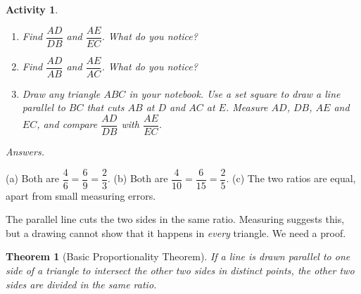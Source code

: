 \documentclass[11pt,a4paper]{article}
\theoremstyle{brand}
\newtheorem{theorem}{Theorem}
\theoremstyle{branddef}
\newtheorem*{activity}{Activity}
\newenvironment{answerblock}
  {\par\smallskip\Needspace{10\baselineskip}\begingroup\small\linespread{1.15}\selectfont\color{muted}\noindent\textit{Answers.}\par}
  {\par\endgroup\medskip}
\newcommand{\ramark}[3]{\coordinate (ra1) at ($(#1)!2mm!(#2)$);\coordinate (ra2) at ($(#1)!2mm!(#3)$);\draw[thin] (ra1) -- ($(ra1)+(ra2)-(#1)$) -- (ra2);}
\begin{document}
\begin{activity}
\begin{enumerate}[leftmargin=1.8em,itemsep=2pt,label=(\alph*)]
  \item Find $\dfrac{AD}{DB}$ and $\dfrac{AE}{EC}$. What do you notice?
  \item Find $\dfrac{AD}{AB}$ and $\dfrac{AE}{AC}$. What do you notice?
  \item Draw any triangle $ABC$ in your notebook. Use a set square to draw a line parallel to $BC$ that cuts $AB$ at $D$ and $AC$ at $E$. Measure $AD$, $DB$, $AE$ and $EC$, and compare $\dfrac{AD}{DB}$ with $\dfrac{AE}{EC}$.
\end{enumerate}
\end{activity}

\begin{answerblock}
(a) Both are $\dfrac46=\dfrac69=\dfrac23$. \quad (b) Both are $\dfrac{4}{10}=\dfrac{6}{15}=\dfrac25$. \quad (c) The two ratios are equal, apart from small measuring errors.
\end{answerblock}

The parallel line cuts the two sides in the same ratio. Measuring suggests this, but a drawing cannot show that it happens in \emph{every} triangle. We need a proof.

\begin{theorem}[Basic Proportionality Theorem]
If a line is drawn parallel to one side of a triangle to intersect the other two sides in distinct points, the other two sides are divided in the same ratio.
\end{theorem}

\begin{center}\end{center}
\end{document}
